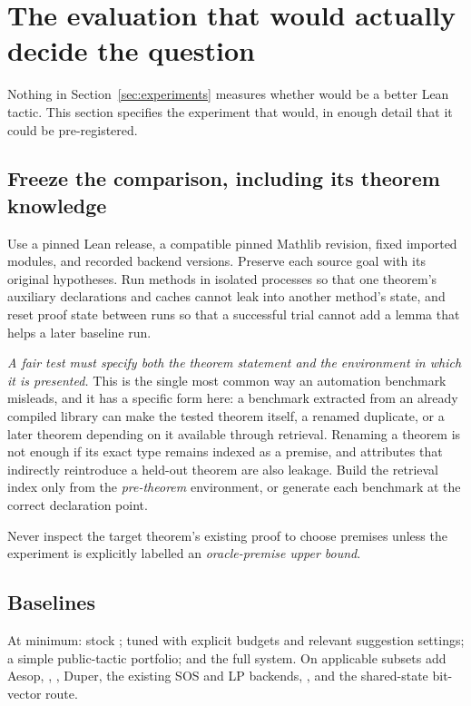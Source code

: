 \section{The evaluation that would actually decide the question}
\label{sec:evaluation}

Nothing in Section~\ref{sec:experiments} measures whether \forge{} would be a
better Lean tactic. This section specifies the experiment that would, in enough
detail that it could be pre-registered.

\subsection{Freeze the comparison, including its theorem knowledge}

Use a pinned Lean release, a compatible pinned Mathlib revision, fixed imported
modules, and recorded backend versions. Preserve each source goal with its
original hypotheses. Run methods in isolated processes so that one theorem's
auxiliary declarations and caches cannot leak into another method's state, and
reset proof state between runs so that a successful trial cannot add a lemma
that helps a later baseline run.

\emph{A fair test must specify both the theorem statement and the environment in
which it is presented.} This is the single most common way an automation
benchmark misleads, and it has a specific form here: a benchmark extracted from
an already compiled library can make the tested theorem itself, a renamed
duplicate, or a later theorem depending on it available through retrieval.
Renaming a theorem is not enough if its exact type remains indexed as a premise,
and attributes that indirectly reintroduce a held-out theorem are also leakage.
Build the retrieval index only from the \emph{pre-theorem} environment, or
generate each benchmark at the correct declaration point.

Never inspect the target theorem's existing proof to choose premises unless the
experiment is explicitly labelled an \emph{oracle-premise upper bound}.

\subsection{Baselines}

At minimum: stock \grind{}; tuned \grind{} with explicit budgets and relevant
suggestion settings; a simple public-tactic portfolio; and the full \forge{}
system. On applicable subsets add Aesop, , , Duper,
the existing SOS and LP backends, , and the shared-state
bit-vector route.

